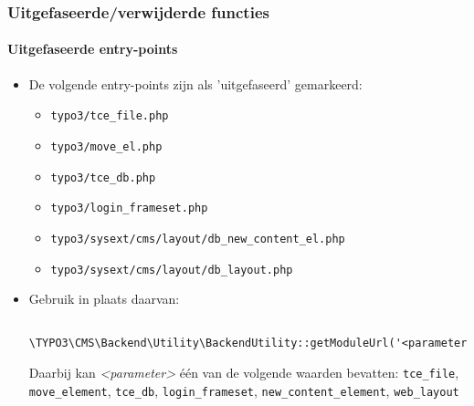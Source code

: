 \begin{frame}[fragile]
	\frametitle{Uitgefaseerde/verwijderde functies}
	\framesubtitle{Uitgefaseerde entry-points}

	\begin{itemize}
		\item De volgende entry-points zijn als 'uitgefaseerd' gemarkeerd:

			\begin{itemize}
				\item \texttt{typo3/tce\_file.php}
				\item \texttt{typo3/move\_el.php}
				\item \texttt{typo3/tce\_db.php}
				\item \texttt{typo3/login\_frameset.php}
				\item \texttt{typo3/sysext/cms/layout/db\_new\_content\_el.php}
				\item \texttt{typo3/sysext/cms/layout/db\_layout.php}
			\end{itemize}

		\item Gebruik in plaats daarvan:
			\begin{lstlisting}
				\TYPO3\CMS\Backend\Utility\BackendUtility::getModuleUrl('<parameter>')
			\end{lstlisting}

			Daarbij kan \textit{<parameter>} één van de volgende waarden bevatten:\newline
				\small
					\texttt{tce\_file}, \texttt{move\_element}, \texttt{tce\_db},
					\texttt{login\_frameset}, \texttt{new\_content\_element}, \texttt{web\_layout}
				\normalsize
	\end{itemize}

\end{frame}


